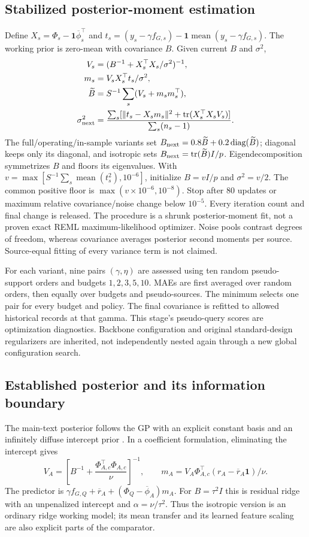 \documentclass[11pt]{article}
\begin{document}
\subsection{Stabilized posterior-moment estimation}
Define $X_s=\Phi_s-\mathbf1\overline\phi_s^\top$ and
$t_s=(y_s-\gamma f_{G,s})-\mathbf1\operatorname{mean}(y_s-\gamma f_{G,s})$.
The working prior is zero-mean with covariance $B$. Given current $B$ and $\sigma^2$,
\begin{align}
V_s&=(B^{-1}+X_s^\top X_s/\sigma^2)^{-1},\\
m_s&=V_sX_s^\top t_s/\sigma^2,\\
\widetilde B&=S^{-1}\sum_s(V_s+m_sm_s^\top),\\
\sigma_{\rm next}^2&=\frac{\sum_s[\|t_s-X_sm_s\|^2+\operatorname{tr}(X_s^\top X_sV_s)]}{\sum_s(n_s-1)}.
\end{align}
The full/operating/in-sample variants set $B_{\rm next}=0.8\widetilde B+0.2\operatorname{diag}(\widetilde B)$; diagonal keeps only its diagonal, and isotropic sets $B_{\rm next}=\operatorname{tr}(\widetilde B)I/p$. Eigendecomposition symmetrizes $B$ and floors its eigenvalues. With $v=\max[S^{-1}\sum_s\operatorname{mean}(t_s^2),10^{-6}]$, initialize $B=vI/p$ and $\sigma^2=v/2$. The common positive floor is $\max(v\times10^{-6},10^{-8})$. Stop after 80 updates or maximum relative covariance/noise change below $10^{-5}$. Every iteration count and final change is released. The procedure is a shrunk posterior-moment fit, not a proven exact REML maximum-likelihood optimizer. Noise pools contrast degrees of freedom, whereas covariance averages posterior second moments per source. Source-equal fitting of every variance term is not claimed.

For each variant, nine pairs $(\gamma,\eta)$ are assessed using ten random pseudo-support orders and budgets $1,2,3,5,10$. MAEs are first averaged over random orders, then equally over budgets and pseudo-sources. The minimum selects one pair for every budget and policy. The final covariance is refitted to allowed historical records at that gamma. This stage's pseudo-query scores are optimization diagnostics. Backbone configuration and original standard-design regularizers are inherited, not independently nested again through a new global configuration search.

\subsection{Established posterior and its information boundary}
The main-text posterior follows the GP with an explicit constant basis and an infinitely diffuse intercept prior \cite{gpml}. In a coefficient formulation, eliminating the intercept gives
\[
V_A=\left[B^{-1}+\frac{\Phi_{A,c}^\top\Phi_{A,c}}{\nu}\right]^{-1},\qquad
m_A=V_A\Phi_{A,c}^\top(r_A-\overline r_A\mathbf1)/\nu.
\]
The predictor is $\gamma f_{G,Q}+\overline r_A+(\Phi_Q-\overline\phi_A)m_A$. For $B=\tau^2I$ this is residual ridge with an unpenalized intercept and $\alpha=\nu/\tau^2$. Thus the isotropic version is an ordinary ridge working model; its mean transfer and its learned feature scaling are also explicit parts of the comparator.
\end{document}
